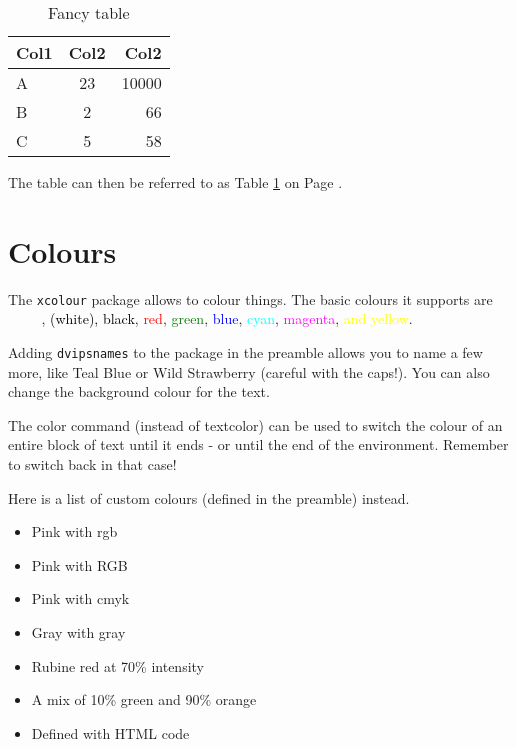 \documentclass[12pt, letterpaper]{article} %
\begin{document}
\begin{table}[h] %
	\centering %
	\begin{tabular}{|| l | c | r ||} %
		\hline %
		Col1 &	Col2 &	Col2	\\ \hline\hline %
		A	 &	23	 &	10000	\\ \hline
		B	 &	2	 &	66		\\ \hline
		C	 &	5	 &	58 		\\ [1ex] \hline %
	\end{tabular}
	\caption{Fancy table} %
	\label{table:data} %
\end{table}

The table can then be referred to as Table \ref{table:data} 
on Page \pageref{table:data}.

\section{Colours}

The \texttt{xcolour} package allows to colour things. 
The basic colours it supports are 
\textcolor{white}{white}, 
\textcolor{black}{(white), black}, 
\textcolor{red}{red}, 
\textcolor{green}{green}, 
\textcolor{blue}{blue}, 
\textcolor{cyan}{cyan}, 
\textcolor{magenta}{magenta}, 
\textcolor{yellow}{and yellow}.

Adding \texttt{dvipsnames} to the package in the preamble 
allows you to name a few more, like 
\textcolor{TealBlue}{Teal Blue} or 
\textcolor{WildStrawberry}{Wild Strawberry} 
(careful with the caps!). 
You can also change \colorbox{BurntOrange}{the background colour} 
for the text.

The color command (instead of textcolor) can be used 
\color{cyan}to switch the colour of an entire block of text 
until it ends - or until the end of the environment. 
Remember to \color{black} switch back in that case!

Here is a list of custom colours (defined in the preamble) instead.
\begin{itemize}
	\item \textcolor{mypink1}{Pink with rgb}
	\item \textcolor{mypink2}{Pink with RGB}
	\item \textcolor{mypink3}{Pink with cmyk}
	\item \textcolor{mygray}{Gray with gray}
	\item \textcolor{LightRubineRed}{Rubine red at 70\% intensity}
	\item \textcolor{OrangeGreen}{A mix of 10\% green and 90\% orange}
	\item \textcolor{HTMLColor}{Defined with HTML code}
\end{itemize}
\end{document}
